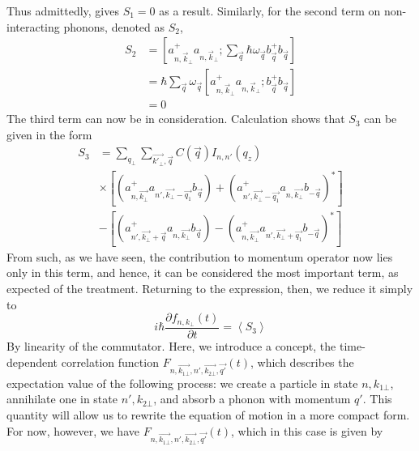 \documentclass[%
 reprint,
 amsmath,amssymb,
 aps,
]{revtex4-2}
\begin{document}
Thus admittedly, gives $S_{1}=0$ as a result. Similarly, for the second term on non-interacting phonons, denoted as $S_{2}$,
\begin{equation}
    \begin{split}
        S_{2} & = \left[ a^{+}_{n,\vec{k}_{\perp}}a_{n,\vec{k}_{\perp}} ; \sum_{\vec{q}} \hbar \omega_{\vec{q}} b^{+}_{\vec{q}}b_{\vec{q}} \right] \\
    & = \hbar \sum_{\vec{q}} \omega_{\vec{q}} \left[ a^{+}_{n,\vec{k}_{\perp}} a_{n,\vec{k}_{\perp}}; b^{+}_{\vec{q}}b_{\vec{q}} \right] \\
    & = 0
    \end{split}
\end{equation}
The third term can now be in consideration. Calculation shows that $S_{3}$ can be given in the form
\begin{equation}
    \begin{split}
        S_3 &= \sum_{q_\bot} \sum_{\vec{k'_\bot},\vec{q}}C\left(\vec{q}\right) I_{n,n'} \left(q_z\right) \\
        &\times \left[\left(a^+_{n, \vec{k_\bot}}a_{n',\vec{k_\bot} - \vec{q_1}}b_{\vec{q}}\right)+ \left(a^+_{n', \vec{k_\bot}-\vec{q_1}}a_{n, \vec{k_\bot}}b_{-\vec{q}}\right)^* \right] \\
    & - \left[\left(a^+_{n', \vec{k_\bot}+\vec{q}}a_{n, \vec{k_\bot}}b_{\vec{q}}\right)- \left(a^+_{n, \vec{k_\bot}}a_{n', \vec{k_\bot}+ \vec{q_1}}b_{-\vec{q}}\right)^*\right]
    \end{split}
\end{equation}
From such, as we have seen, the contribution to momentum operator now lies only in this term, and hence, it can be considered the most important term, as expected of the treatment. Returning to the expression, then, we reduce it simply to 
\begin{equation}
    i \hbar \frac{\partial f_{n, k_{\perp}}(t)}{\partial t} = \left\langle S_{3} \right\rangle
\end{equation}
By linearity of the commutator. Here, we introduce a concept, the time-dependent correlation function $F_{n, \vec{k_{1\bot}}, n',\vec{k_{2\bot}},\vec{q'}}(t)$, which describes the expectation value of the following process: we create a particle in state $n,k_{1\bot}$, annihilate one in state $n', k_{2\bot}$, and absorb a phonon with momentum $q'$. This quantity will allow us to rewrite the equation of motion in a more compact form. For now, however, we have  $F_{n,\vec{k_{1\bot}},n', \vec{k_{2\bot}},\vec{q'}}(t)$, which in this case is given by
\end{document}
